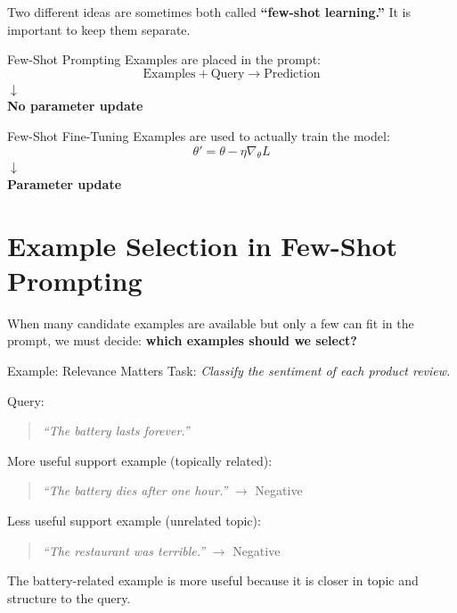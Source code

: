 \documentclass[11pt]{article}
\begin{document}
Two different ideas are sometimes both called \textbf{``few-shot learning.''} It is important to keep them separate.

\noindent
\begin{minipage}[t]{0.48\textwidth}
\begin{greenbox}{Few-Shot Prompting}
Examples are placed in the prompt:
\[
\text{Examples} + \text{Query} \rightarrow \text{Prediction}
\]
\centering \Large$\downarrow$\\[2pt]
\normalsize\textbf{No parameter update}
\end{greenbox}
\end{minipage}
\hfill
\begin{minipage}[t]{0.48\textwidth}
\begin{pinkbox}{Few-Shot Fine-Tuning}
Examples are used to actually train the model:
\[
\theta' = \theta - \eta \nabla_\theta L
\]
\centering \Large$\downarrow$\\[2pt]
\normalsize\textbf{Parameter update}
\end{pinkbox}
\end{minipage}


\section*{Example Selection in Few-Shot Prompting}

When many candidate examples are available but only a few can fit in the prompt, we must decide: \textbf{which examples should we select?}

\begin{stepbox}{Example: Relevance Matters}
Task: \; \emph{Classify the sentiment of each product review.}

Query:
\begin{quote}
\emph{``The battery lasts forever.''}
\end{quote}

More useful support example (topically related):
\begin{quote}
\emph{``The battery dies after one hour.''} $\rightarrow$ Negative
\end{quote}

Less useful support example (unrelated topic):
\begin{quote}
\emph{``The restaurant was terrible.''} $\rightarrow$ Negative
\end{quote}

The battery-related example is more useful because it is closer in topic and structure to the query.
\end{stepbox}
\end{document}
